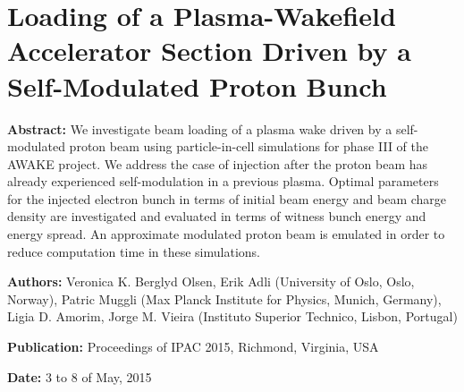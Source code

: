 %
%

\chapter{Loading of a Plasma-Wakefield Accelerator Section Driven by a Self-Modulated Proton Bunch}
\label{Pub:IPAC15}

\begin{hangparas}{10mm}{1}

    \textbf{Abstract:}
    We investigate beam loading of a plasma wake driven by a self-modulated proton beam using particle-in-cell
    simulations for phase III of the AWAKE project. We address the case of injection after the proton beam has already
    experienced self-modulation in a previous plasma. Optimal parameters for the injected electron bunch in terms of
    initial beam energy and beam charge density are investigated and evaluated in terms of witness bunch energy and
    energy spread. An approximate modulated proton beam is emulated in order to reduce computation time in these
    simulations.

    \vspace{8mm}

    \textbf{Authors:}
    Veronica K. Berglyd Olsen, Erik Adli (University of Oslo, Oslo, Norway),
    Patric Muggli (Max Planck Institute for Physics, Munich, Germany),
    Ligia D. Amorim, Jorge M. Vieira (Instituto Superior Technico, Lisbon, Portugal)

    \vspace{5mm}

    \textbf{Publication:}
    Proceedings of IPAC 2015, Richmond, Virginia, USA  \cite{berglyd_olsen:2015}

    \vspace{5mm}

    \textbf{Date:} 3 to 8 of May, 2015

\end{hangparas}
